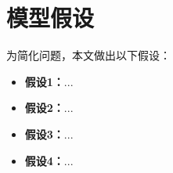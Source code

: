 
\section{模型假设}

为简化问题，本文做出以下假设：

\begin{itemize}[itemindent=2em]
\item \textbf{假设1：}...
\item \textbf{假设2：}...
\item \textbf{假设3：}...
\item \textbf{假设4：}...
\end{itemize}
